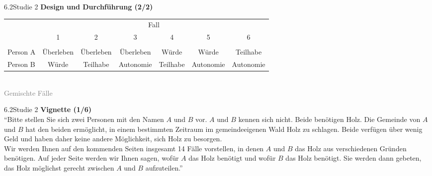 \documentclass[xcolor=table,9pt,aspectratio=169]{beamer}
\begin{document}
\begin{frame}{\vspace*{10mm}6.2\hspace*{1em}Studie 2}
\textbf{Design und Durchführung (2/2)}\\
\medskip
\begin{center}
   \begin{tabular}{lcccccc}
      \arrayrulecolor{blue2}
      \hline
                 & \multicolumn{6}{c}{Fall}                                                         \\
                 & 1           & 2           & 3           & 4          & 5           & 6           \\
      \hline\hline\\[-0.5em]
      Person A   & Überleben   & Überleben   & Überleben   & Würde      & Würde       & Teilhabe    \\
      Person B   & Würde       & Teilhabe    & Autonomie   & Teilhabe   & Autonomie   & Autonomie   \\
      \hline
   \end{tabular}\\
   \smallskip
   \textcolor{gray}{Gemischte Fälle}
\end{center}
\end{frame}


\begin{frame}{\vspace*{10mm}6.2\hspace*{1em}Studie 2}
\textbf{Vignette (1/6)}\\
\medskip
\enquote{Bitte stellen Sie sich zwei Personen mit den Namen $A$ und $B$ vor. $A$ und $B$ kennen sich nicht. Beide benötigen Holz. Die Gemeinde von $A$ und $B$ hat den beiden ermöglicht, in einem bestimmten Zeitraum im gemeindeeigenen Wald Holz zu schlagen. Beide verfügen über wenig Geld und haben daher keine andere Möglichkeit, sich Holz zu besorgen.\\
\medskip
Wir werden Ihnen auf den kommenden Seiten insgesamt 14 Fälle vorstellen, in denen $A$ und $B$ das Holz aus verschiedenen Gründen benötigen. Auf jeder Seite werden wir Ihnen sagen, wofür $A$ das Holz benötigt und wofür $B$ das Holz benötigt. Sie werden dann gebeten, das Holz möglichst gerecht zwischen $A$ und $B$ aufzuteilen.}
\end{frame}
\end{document}
